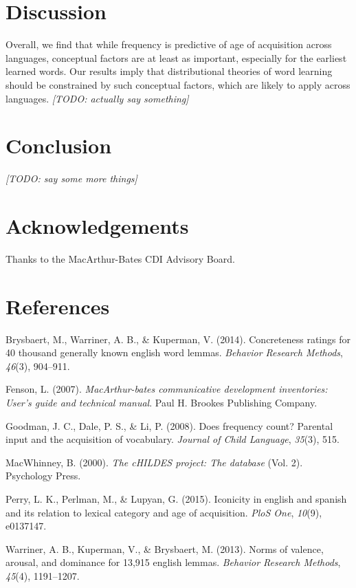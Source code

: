 \documentclass[10pt, letterpaper]{article}
\begin{document}
\section{Discussion}\label{discussion}

Overall, we find that while frequency is predictive of age of
acquisition across languages, conceptual factors are at least as
important, especially for the earliest learned words. Our results imply
that distributional theories of word learning should be constrained by
such conceptual factors, which are likely to apply across languages.
\emph{{[}TODO: actually say something{]}}

\newpage

\section{Conclusion}\label{conclusion}

\emph{{[}TODO: say some more things{]}}

\section{Acknowledgements}\label{acknowledgements}

Thanks to the MacArthur-Bates CDI Advisory Board.

\section{References}\label{references}

\setlength{\parindent}{-0.1in} \setlength{\leftskip}{0.125in} \noindent

Brysbaert, M., Warriner, A. B., \& Kuperman, V. (2014). Concreteness
ratings for 40 thousand generally known english word lemmas.
\emph{Behavior Research Methods}, \emph{46}(3), 904--911.

Fenson, L. (2007). \emph{MacArthur-bates communicative development
inventories: User's guide and technical manual}. Paul H. Brookes
Publishing Company.

Goodman, J. C., Dale, P. S., \& Li, P. (2008). Does frequency count?
Parental input and the acquisition of vocabulary. \emph{Journal of Child
Language}, \emph{35}(3), 515.

MacWhinney, B. (2000). \emph{The cHILDES project: The database} (Vol.
2). Psychology Press.

Perry, L. K., Perlman, M., \& Lupyan, G. (2015). Iconicity in english
and spanish and its relation to lexical category and age of acquisition.
\emph{PloS One}, \emph{10}(9), e0137147.

Warriner, A. B., Kuperman, V., \& Brysbaert, M. (2013). Norms of
valence, arousal, and dominance for 13,915 english lemmas.
\emph{Behavior Research Methods}, \emph{45}(4), 1191--1207.
\end{document}
